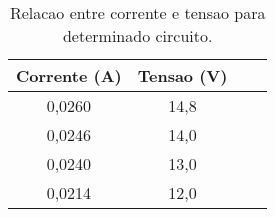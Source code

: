 % 

\begin{table}[H] \label{T:tab_exemp} \centering
    \caption{Relacao entre corrente e tensao para determinado circuito.}
    \begin{tabular}{|c|c|c|c|}
        \hline Corrente (A) & Tensao (V) \\ 
        \hline 0,0260 & 14,8 \\
        \hline 0,0246 & 14,0 \\
        \hline 0,0240 & 13,0 \\
        \hline 0,0214 & 12,0 \\
        \hline 
    \end{tabular}
\end{table}
